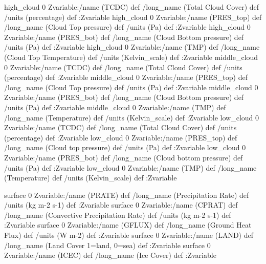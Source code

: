 \begin{ingrid}

high_cloud 0 Zvariable:/name (TCDC) def /long_name (Total Cloud Cover) def /units (percentage) def :Zvariable
high_cloud 0 Zvariable:/name (PRES_top) def /long_name (Cloud Top pressure) def /units (Pa) def :Zvariable 
high_cloud 0 Zvariable:/name (PRES_bot) def /long_name (Cloud Bottom pressure) def /units (Pa) def :Zvariable
high_cloud 0 Zvariable:/name (TMP) def /long_name (Cloud Top Temperature) def /units (Kelvin_scale) def :Zvariable
middle_cloud 0 Zvariable:/name (TCDC) def /long_name (Total Cloud Cover) def /units (percentage) def :Zvariable
middle_cloud 0 Zvariable:/name (PRES_top) def /long_name (Cloud Top pressure) def /units (Pa) def :Zvariable
middle_cloud 0 Zvariable:/name (PRES_bot) def /long_name (Cloud Bottom pressure) def /units (Pa) def :Zvariable
middle_cloud 0 Zvariable:/name (TMP) def /long_name (Temperature) def /units (Kelvin_scale) def :Zvariable
low_cloud 0 Zvariable:/name (TCDC) def /long_name (Total Cloud Cover) def /units (percentage) def :Zvariable
low_cloud 0 Zvariable:/name (PRES_top) def /long_name (Cloud top pressure) def /units (Pa) def :Zvariable
low_cloud 0 Zvariable:/name (PRES_bot) def /long_name (Cloud bottom pressure) def /units (Pa) def :Zvariable
low_cloud 0 Zvariable:/name (TMP) def /long_name (Temperature) def /units (Kelvin_scale) def :Zvariable

\end{ingrid}
\begin{ingrid}

surface 0 Zvariable:/name (PRATE) def /long_name (Precipitation Rate) def /units (kg m-2 s-1) def :Zvariable
surface 0 Zvariable:/name (CPRAT) def /long_name (Convective Precipitation Rate) def /units (kg m-2 s-1) def :Zvariable
surface 0 Zvariable:/name (GFLUX) def /long_name (Ground Heat Flux) def /units (W m-2) def :Zvariable 
surface 0 Zvariable:/name (LAND) def /long_name (Land Cover 1=land, 0=sea) def :Zvariable
surface 0 Zvariable:/name (ICEC) def /long_name (Ice Cover) def :Zvariable

\end{ingrid}
